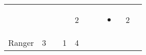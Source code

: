 \documentclass[12pt]{article}
\begin{document}
\begin{longtable}[]{@{}llllllllll@{}}
\begin{minipage}[t]{0.06\columnwidth}
\strut\end{minipage} &
\begin{minipage}[t]{0.06\columnwidth}\raggedright\strut
\strut\end{minipage} &
\begin{minipage}[t]{0.06\columnwidth}\raggedright\strut
\strut\end{minipage} &
\begin{minipage}[t]{0.06\columnwidth}\raggedright\strut
\strut\end{minipage} &
\begin{minipage}[t]{0.06\columnwidth}\raggedright\strut
2
\strut\end{minipage} &
\begin{minipage}[t]{0.06\columnwidth}\raggedright\strut
\strut\end{minipage} &
\begin{minipage}[t]{0.06\columnwidth}\raggedright\strut
\strut\end{minipage} &
\begin{minipage}[t]{0.07\columnwidth}\raggedright\strut
\begin{itemize}
\item
\end{itemize}
\strut\end{minipage} &
\begin{minipage}[t]{0.08\columnwidth}\raggedright\strut
2
\strut\end{minipage}\tabularnewline
\begin{minipage}[t]{0.13\columnwidth}\raggedright\strut
Ranger
\strut\end{minipage} &
\begin{minipage}[t]{0.06\columnwidth}\raggedright\strut
3
\strut\end{minipage} &
\begin{minipage}[t]{0.06\columnwidth}\raggedright\strut
\strut\end{minipage} &
\begin{minipage}[t]{0.06\columnwidth}\raggedright\strut
1
\strut\end{minipage} &
\begin{minipage}[t]{0.06\columnwidth}\raggedright\strut
4
\strut\end{minipage} &
\begin{minipage}[t]{0.06\columnwidth}\raggedright\strut
\strut\end{minipage} &
\begin{minipage}[t]{0.06\columnwidth}\raggedright\strut
\strut\end{minipage} &

\end{longtable}
\end{document}
